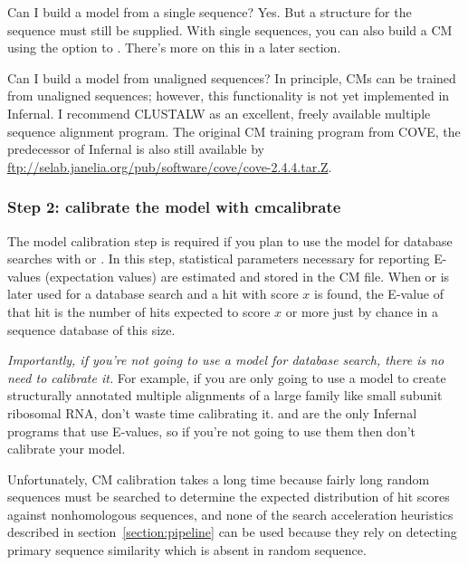 \begin{srefaq}{Can I build a model from a single sequence?}
Yes. But a structure for the sequence must still be supplied.
With single sequences, you can also build a  \cite{KleinEddy03} CM 
using the  option to . There's more on
this in a later section.
\end{srefaq}

\begin{srefaq}{Can I build a model from unaligned sequences?}
In principle, CMs can be trained from unaligned sequences;
however, this functionality is not yet implemented in Infernal.  I
recommend CLUSTALW as an excellent, freely available multiple sequence
alignment program. The original  CM training
program from COVE, the predecessor of Infernal is also
still available by
\url{ftp://selab.janelia.org/pub/software/cove/cove-2.4.4.tar.Z}.
\end{srefaq}

\subsubsection{Step 2: calibrate the model with cmcalibrate}

The model calibration step is required if you plan to use the model
for database searches with  or . In this
step, statistical parameters necessary for reporting E-values
(expectation values) are estimated and stored in the CM file.  When
 or  is later used for a database search
and a hit with score $x$ is found, the E-value of that hit is the
number of hits expected to score $x$ or more just by chance in a
sequence database of this size. 

\emph{Importantly, if you're not going to use a model for database
search, there is no need to calibrate it.} For example, if you are
only going to use a model to create structurally annotated multiple
alignments of a large family like small subunit ribosomal RNA, don't
waste time calibrating it.  and  are the
only Infernal programs that use E-values, so if you're not going to
use them then don't calibrate your model.

Unfortunately, CM calibration takes a long time because fairly long
random sequences must be searched to determine the expected
distribution of hit scores against nonhomologous sequences, and none
of the search acceleration heuristics described in
section~\ref{section:pipeline} can be used because they rely on
detecting primary sequence similarity which is absent in random
sequence. 

